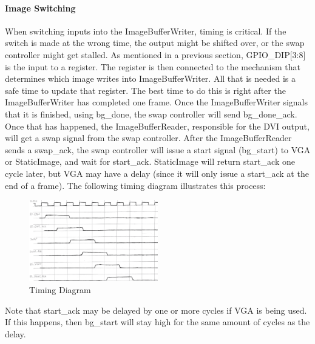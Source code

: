 \paragraph{Image Switching}
When switching inputs into the ImageBufferWriter, timing is critical. If the switch is made at the wrong time, the output might be shifted over, or the swap controller might get stalled. As mentioned in a previous section, GPIO\_DIP[3:8] is the input to a register. The register is then connected to the mechanism that determines which image writes into ImageBufferWriter. All that is needed is a safe time to update that register. The best time to do this is right after the ImageBufferWriter has completed one frame. Once the ImageBufferWriter signals that it is finished, using bg\_done, the swap controller will send bg\_done\_ack. Once that has happened, the ImageBufferReader, responsible for the DVI output, will get a swap signal from the swap controller. After the ImageBufferReader sends a swap\_ack, the swap controller will issue a start signal (bg\_start) to VGA or StaticImage, and wait for start\_ack. StaticImage will return start\_ack one cycle later, but VGA may have a delay (since it will only issue a start\_ack at the end of a frame). The following timing diagram illustrates this process:

\begin{figure}
    \includegraphics[width=0.5\textwidth]{processed_image_pngs/timing_3.png}
    \caption{Timing Diagram}
    \label{fig:timing_3}
\end{figure}


Note that start\_ack may be delayed by one or more cycles if VGA is being used. If this happens, then bg\_start will stay high for the same amount of cycles as the delay.

